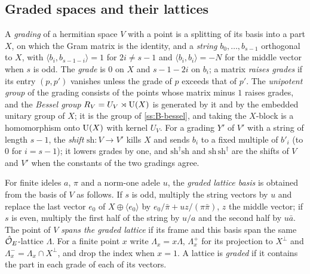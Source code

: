\subsection{Graded spaces and their lattices}\label{ss:graded}
A \emph{grading} of a hermitian space $V$ with a point is a splitting of its basis into a part $X$, on which the
Gram matrix is the identity, and a \emph{string} $b_0,\dots,b_{s-1}$ orthogonal to $X$, with $\langle b_i,b_{s-1-i}\rangle=1$
for $2i\ne s-1$ and $\langle b_i,b_i\rangle=-N$ for the middle vector when $s$ is odd. The \emph{grade} is $0$ on $X$ and
$s-1-2i$ on $b_i$; a matrix \emph{raises grades} if its entry $(p,p')$ vanishes unless the grade of $p$ exceeds
that of $p'$. The \emph{unipotent group} of the grading consists of the points whose matrix minus $1$ raises
grades, and the \emph{Bessel group} $R_V=U_V\rtimes\operatorname{U}(X)$ is generated by it and by the embedded unitary group of
$X$; it is the group of \cref{ss:B-bessel}, and taking the $X$-block is a homomorphism onto $\operatorname{U}(X)$ with kernel
$U_V$. For a grading $Y'$ of $V'$ with a string of length $s-1$, the \emph{shift} $\mathrm{sh}\colon V\to V'$ kills $X$
and sends $b_i$ to a fixed multiple of $b'_i$ (to $0$ for $i=s-1$); it lowers grades by one, and $\mathrm{sh}^\dagger\mathrm{sh}$
and $\mathrm{sh}\,\mathrm{sh}^\dagger$ are the shifts of $V$ and $V'$ when the constants of the two gradings agree.

For finite ideles $a$, $\pi$ and a norm-one adele $u$, the \emph{graded lattice basis} is obtained from the basis
of $V$ as follows. If $s$ is odd, multiply the string vectors by $u$ and replace the last vector $e_0$ of
$X\oplus\langle e_0\rangle$ by $e_0/\bar\pi+uz/(\pi\bar\pi)$, $z$ the middle vector; if $s$ is even, multiply the first half of the
string by $u/a$ and the second half by $u\bar a$. The point of $V$ \emph{spans the graded lattice} if its frame and
this basis span the same $\hat{\mathcal{O}}_E$-lattice $\Lambda$. For a finite point $x$ write $\Lambda_x=x\Lambda$, $\Lambda^+_x$ for its
projection to $X^\perp$ and $\Lambda^-_x=\Lambda_x\cap X^\perp$, and drop the index when $x=1$. A lattice is \emph{graded} if it
contains the part in each grade of each of its vectors.

